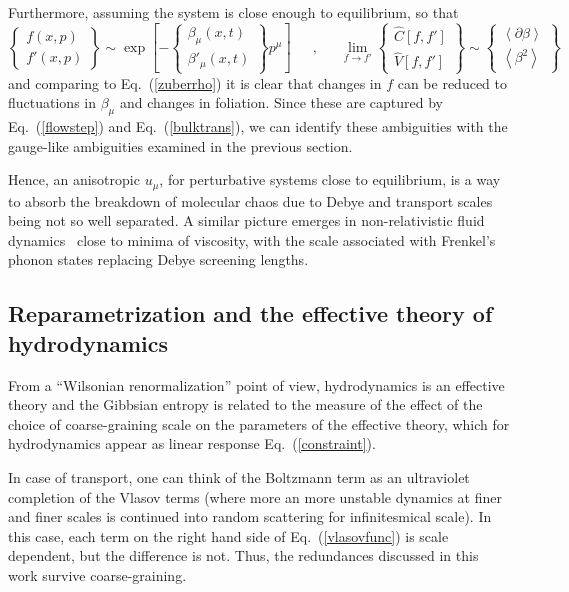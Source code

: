 \documentclass[12pt,onecolumn,showpacs,amssymb,aps,nofootinbib,floatfix]{revtex4-2}
\newcommand{\ave}[1]{\left\langle #1 \right\rangle}
\renewcommand{\eqref}[1]{Eq.~(\ref{#1})}
\newcommand{\eqcomma}{\phantom{AA},\phantom{AA}}
\begin{document}
Furthermore, assuming the system is close enough to equilibrium, so that
    \begin{equation}
      \label{vlaszub}
      \left\{
\begin{array}{c}
  f(x,p)\\
  f'(x,p)
\end{array}
\right\} \sim \exp\left [-\left\{
\begin{array}{c}
  \beta_\mu(x,t)\\
  \beta'_\mu(x,t)
\end{array} \right\}
p^\mu \right] \eqcomma \lim_{f \rightarrow f'} \left\{ \begin{array}{c}  \hat{C}[f,f']\\
  \hat{V}[f,f']
\end{array} \right\} \sim \left\{
\begin{array}{c}
\ave{\partial \beta} \\
\ave{\beta^2} \end{array}
\right\}
\end{equation}
  and comparing to \eqref{zuberrho} it is clear that changes in $f$ can be reduced to fluctuations in $\beta_\mu$ and changes in foliation.  Since these are captured by \eqref{flowstep} and \eqref{bulktrans}, we can identify these ambiguities with the gauge-like ambiguities examined in the previous section.\color{black}

Hence, an anisotropic $u_\mu$, for perturbative systems close to equilibrium, is a way to absorb the breakdown of molecular chaos due to Debye and transport scales being not so well separated.    A similar picture emerges in non-relativistic fluid dynamics~\cite{trachenko} close to minima of viscosity, with the scale associated with Frenkel's phonon states replacing Debye screening lengths. 
	\subsection{Reparametrization and the effective theory of hydrodynamics \label{justeft}}
	From a ``Wilsonian renormalization'' point of view, hydrodynamics is an effective theory and the Gibbsian entropy is related to the measure of the effect of the choice of coarse-graining scale on the parameters of the effective theory, which for hydrodynamics appear as linear response \eqref{constraint}\cite{kadanoff}.

        \color{black}
  In case of transport, one can think of the Boltzmann term as an ultraviolet completion of the Vlasov terms (where more an more unstable dynamics at finer and finer scales is continued into random scattering for infinitesmical scale).  In this case, each term on the right hand side of  \eqref{vlasovfunc} is scale dependent, but the difference is not.   Thus, the redundances discussed in this work survive coarse-graining.\color{black}
        
\end{document}
